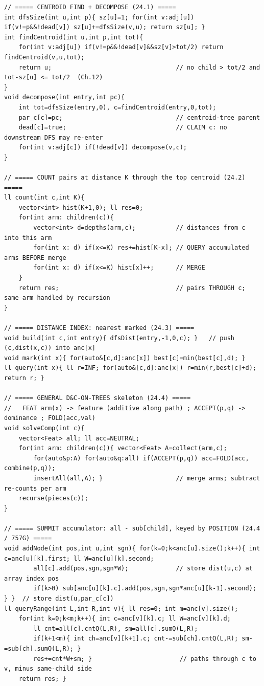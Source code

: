 \begin{lstlisting}[caption={Chapter 24 kit: the centroid find and the decompose-and-recurse build, the query-then-merge arm count, the per-centroid distance index with its nearest-marked query, the general D-C-on-trees skeleton, the Summit all-minus-sub range accumulator, and a Fenwick -- one compact skeleton each, in one place.}, label={lst:c18-kit}]
// ===== CENTROID FIND + DECOMPOSE (24.1) =====
int dfsSize(int u,int p){ sz[u]=1; for(int v:adj[u]) if(v!=p&&!dead[v]) sz[u]+=dfsSize(v,u); return sz[u]; }
int findCentroid(int u,int p,int tot){
    for(int v:adj[u]) if(v!=p&&!dead[v]&&sz[v]>tot/2) return findCentroid(v,u,tot);
    return u;                                  // no child > tot/2 and tot-sz[u] <= tot/2  (Ch.12)
}
void decompose(int entry,int pc){
    int tot=dfsSize(entry,0), c=findCentroid(entry,0,tot);
    par_c[c]=pc;                               // centroid-tree parent
    dead[c]=true;                              // CLAIM c: no downstream DFS may re-enter
    for(int v:adj[c]) if(!dead[v]) decompose(v,c);
}

// ===== COUNT pairs at distance K through the top centroid (24.2) =====
ll count(int c,int K){
    vector<int> hist(K+1,0); ll res=0;
    for(int arm: children(c)){
        vector<int> d=depths(arm,c);           // distances from c into this arm
        for(int x: d) if(x<=K) res+=hist[K-x]; // QUERY accumulated arms BEFORE merge
        for(int x: d) if(x<=K) hist[x]++;      // MERGE
    }
    return res;                                // pairs THROUGH c; same-arm handled by recursion
}

// ===== DISTANCE INDEX: nearest marked (24.3) =====
void build(int c,int entry){ dfsDist(entry,-1,0,c); }   // push (c,dist(x,c)) into anc[x]
void mark(int x){ for(auto&[c,d]:anc[x]) best[c]=min(best[c],d); }
ll query(int x){ ll r=INF; for(auto&[c,d]:anc[x]) r=min(r,best[c]+d); return r; }

// ===== GENERAL D&C-ON-TREES skeleton (24.4) =====
//   FEAT arm(x) -> feature (additive along path) ; ACCEPT(p,q) -> dominance ; FOLD(acc,val)
void solveComp(int c){
    vector<Feat> all; ll acc=NEUTRAL;
    for(int arm: children(c)){ vector<Feat> A=collect(arm,c);
        for(auto&p:A) for(auto&q:all) if(ACCEPT(p,q)) acc=FOLD(acc, combine(p,q));
        insertAll(all,A); }                    // merge arms; subtract re-counts per arm
    recurse(pieces(c));
}

// ===== SUMMIT accumulator: all - sub[child], keyed by POSITION (24.4 / 757G) =====
void addNode(int pos,int u,int sgn){ for(k=0;k<anc[u].size();k++){ int c=anc[u][k].first; ll W=anc[u][k].second;
        all[c].add(pos,sgn,sgn*W);             // store dist(u,c) at array index pos
        if(k>0) sub[anc[u][k].c].add(pos,sgn,sgn*anc[u][k-1].second); } }  // store dist(u,par_c[c])
ll queryRange(int L,int R,int v){ ll res=0; int m=anc[v].size();
    for(int k=0;k<m;k++){ int c=anc[v][k].c; ll W=anc[v][k].d;
        ll cnt=all[c].cntQ(L,R), sm=all[c].sumQ(L,R);
        if(k+1<m){ int ch=anc[v][k+1].c; cnt-=sub[ch].cntQ(L,R); sm-=sub[ch].sumQ(L,R); }
        res+=cnt*W+sm; }                        // paths through c to v, minus same-child side
    return res; }


\end{lstlisting}
